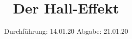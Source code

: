 

\subject{V311}
\title{Der Hall-Effekt}
\date{%
  Durchführung: 14.01.20
  \hspace{3em}
  Abgabe: 21.01.20
}



\maketitle
\thispagestyle{empty}
\tableofcontents
\newpage







\printbibliography{}


